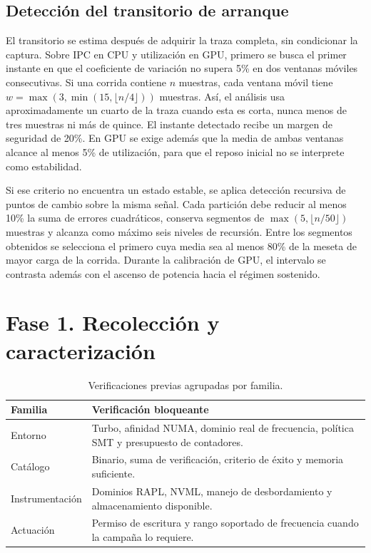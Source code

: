 \subsection{Detección del transitorio de arranque}
\label{sec:calentamiento}

El transitorio se estima después de adquirir la traza completa, sin condicionar la captura. Sobre IPC en CPU y utilización en GPU, primero se busca el primer instante en que el coeficiente de variación no supera 5\% en dos ventanas móviles consecutivas. Si una corrida contiene $n$ muestras, cada ventana móvil tiene $w=\max(3,\min(15,\lfloor n/4\rfloor))$ muestras. Así, el análisis usa aproximadamente un cuarto de la traza cuando esta es corta, nunca menos de tres muestras ni más de quince. El instante detectado recibe un margen de seguridad de 20\%. En GPU se exige además que la media de ambas ventanas alcance al menos 5\% de utilización, para que el reposo inicial no se interprete como estabilidad.

Si ese criterio no encuentra un estado estable, se aplica detección recursiva de puntos de cambio sobre la misma señal. Cada partición debe reducir al menos 10\% la suma de errores cuadráticos, conserva segmentos de $\max(5,\lfloor n/50\rfloor)$ muestras y alcanza como máximo seis niveles de recursión. Entre los segmentos obtenidos se selecciona el primero cuya media sea al menos 80\% de la meseta de mayor carga de la corrida. Durante la calibración de GPU, el intervalo se contrasta además con el ascenso de potencia hacia el régimen sostenido.

\section{Fase 1. Recolección y caracterización}

\begin{table}[H]
\centering
\caption{Verificaciones previas agrupadas por familia.}
\label{tab:verificaciones-previas}
\small
\begin{tabular}{@{}p{3.5cm}p{9.5cm}@{}}
\toprule
\textbf{Familia} & \textbf{Verificación bloqueante} \\
\midrule
Entorno & Turbo, afinidad NUMA, dominio real de frecuencia, política SMT y presupuesto de contadores. \\
Catálogo & Binario, suma de verificación, criterio de éxito y memoria suficiente. \\
Instrumentación & Dominios RAPL, NVML, manejo de desbordamiento y almacenamiento disponible. \\
Actuación & Permiso de escritura y rango soportado de frecuencia cuando la campaña lo requiere. \\
\bottomrule
\end{tabular}
\end{table}

